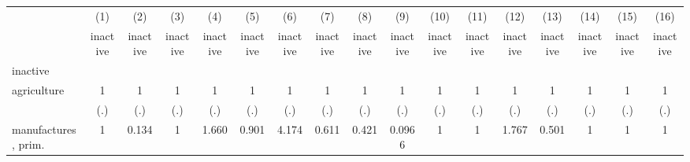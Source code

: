 {
\def\sym#1{\ifmmode^{#1}\else\(^{#1}\)\fi}
\begin{tabular}{l*{16}{c}}
\hline\hline
                    &\multicolumn{1}{c}{(1)}&\multicolumn{1}{c}{(2)}&\multicolumn{1}{c}{(3)}&\multicolumn{1}{c}{(4)}&\multicolumn{1}{c}{(5)}&\multicolumn{1}{c}{(6)}&\multicolumn{1}{c}{(7)}&\multicolumn{1}{c}{(8)}&\multicolumn{1}{c}{(9)}&\multicolumn{1}{c}{(10)}&\multicolumn{1}{c}{(11)}&\multicolumn{1}{c}{(12)}&\multicolumn{1}{c}{(13)}&\multicolumn{1}{c}{(14)}&\multicolumn{1}{c}{(15)}&\multicolumn{1}{c}{(16)}\\
                    &\multicolumn{1}{c}{inactive}&\multicolumn{1}{c}{inactive}&\multicolumn{1}{c}{inactive}&\multicolumn{1}{c}{inactive}&\multicolumn{1}{c}{inactive}&\multicolumn{1}{c}{inactive}&\multicolumn{1}{c}{inactive}&\multicolumn{1}{c}{inactive}&\multicolumn{1}{c}{inactive}&\multicolumn{1}{c}{inactive}&\multicolumn{1}{c}{inactive}&\multicolumn{1}{c}{inactive}&\multicolumn{1}{c}{inactive}&\multicolumn{1}{c}{inactive}&\multicolumn{1}{c}{inactive}&\multicolumn{1}{c}{inactive}\\
\hline
inactive            &                     &                     &                     &                     &                     &                     &                     &                     &                     &                     &                     &                     &                     &                     &                     &                     \\
agriculture         &           1         &           1         &           1         &           1         &           1         &           1         &           1         &           1         &           1         &           1         &           1         &           1         &           1         &           1         &           1         &           1         \\
                    &         (.)         &         (.)         &         (.)         &         (.)         &         (.)         &         (.)         &         (.)         &         (.)         &         (.)         &         (.)         &         (.)         &         (.)         &         (.)         &         (.)         &         (.)         &         (.)         \\
[1em]
manufactures, prim. &           1         &       0.134         &           1         &       1.660         &       0.901         &       4.174         &       0.611         &       0.421         &      0.0966         &           1         &           1         &       1.767         &       0.501         &           1         &           1         &           1         \\

\end{tabular}}
